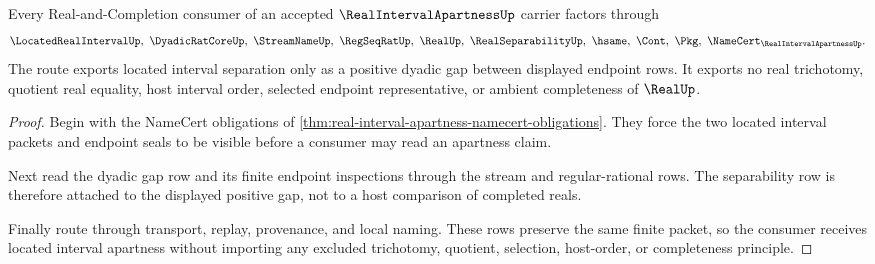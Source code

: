 \begin{theorem}
\label{thm:real-interval-apartness-separability-route}
Every Real-and-Completion consumer of an accepted $\RealIntervalApartnessUp$ carrier factors through
$$
\LocatedRealIntervalUp,\ \DyadicRatCoreUp,\ \StreamNameUp,\ \RegSeqRatUp,\ \RealUp,\ \RealSeparabilityUp,\ \hsame,\ \Cont,\ \Pkg,\ \NameCert_{\RealIntervalApartnessUp}.
$$
The route exports located interval separation only as a positive dyadic gap between displayed endpoint rows. It exports no real trichotomy, quotient real equality, host interval order, selected endpoint representative, or ambient completeness of $\RealUp$.
\end{theorem}
\begin{proof}
Begin with the NameCert obligations of \autoref{thm:real-interval-apartness-namecert-obligations}. They force the two located interval packets and endpoint seals to be visible before a consumer may read an apartness claim.

Next read the dyadic gap row and its finite endpoint inspections through the stream and regular-rational rows. The separability row is therefore attached to the displayed positive gap, not to a host comparison of completed reals.

Finally route through transport, replay, provenance, and local naming. These rows preserve the same finite packet, so the consumer receives located interval apartness without importing any excluded trichotomy, quotient, selection, host-order, or completeness principle.
\end{proof}


\begin{closurestatus}{\RealIntervalApartnessUp}
  \theoryclosure{\seedClosure}
  \formalstatus{\unformalizedV}
\end{closurestatus}
